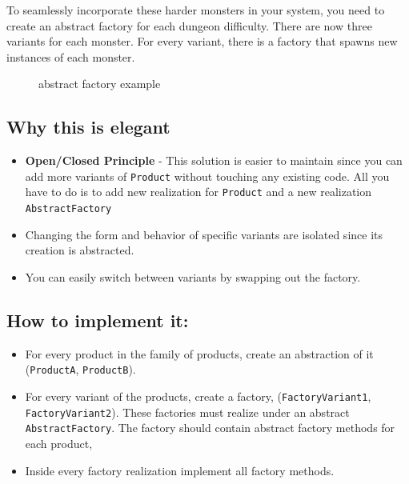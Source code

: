 To seamlessly incorporate these harder monsters in your system, you need
to create an abstract factory for each dungeon difficulty. There are now
three variants for each monster. For every variant, there is a factory
that spawns new instances of each monster.

\begin{figure}
\centering
{}
\caption{abstract factory example}
\end{figure}

\subsection{Why this is
elegant}\label{creational-patterns.md__why-this-is-elegant-1}

\begin{itemize}
\tightlist
\item
  \textbf{Open/Closed Principle} - This solution is easier to maintain
  since you can add more variants of \texttt{Product} without touching
  any existing code. All you have to do is to add new realization for
  \texttt{Product} and a new realization \texttt{AbstractFactory}
\item
  Changing the form and behavior of specific variants are isolated since
  its creation is abstracted.
\item
  You can easily switch between variants by swapping out the factory.
\end{itemize}

\subsection{How to implement
it:}\label{creational-patterns.md__how-to-implement-it-1}

\begin{itemize}
\tightlist
\item
  For every product in the family of products, create an abstraction of
  it (\texttt{ProductA}, \texttt{ProductB}).
\item
  For every variant of the products, create a factory,
  (\texttt{FactoryVariant1}, \texttt{FactoryVariant2}). These factories
  must realize under an abstract \texttt{AbstractFactory}. The factory
  should contain abstract factory methods for each product,
\item
  Inside every factory realization implement all factory methods.
\end{itemize}

